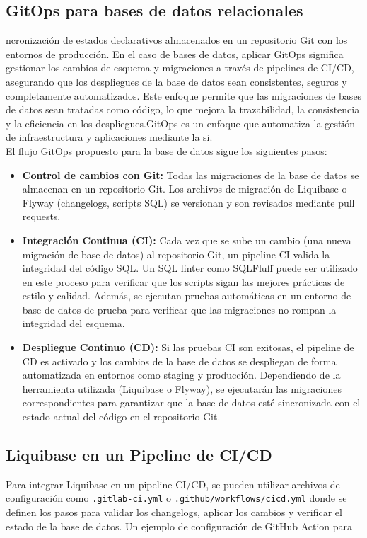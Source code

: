 \documentclass{IEEEtran}
\begin{document}
\subsection{GitOps para bases de datos relacionales}
ncronización de estados declarativos almacenados en un repositorio Git con los entornos de producción. En el caso de bases de datos, aplicar GitOps significa gestionar los cambios de esquema y migraciones a través de pipelines de CI/CD, asegurando que los despliegues de la base de datos sean consistentes, seguros y completamente automatizados. Este enfoque permite que las migraciones de bases de datos sean tratadas como código, lo que mejora la trazabilidad, la consistencia y la eficiencia en los despliegues.GitOps es un enfoque que automatiza la gestión de infraestructura y aplicaciones mediante la si.\\
El flujo GitOps propuesto para la base de datos sigue los siguientes pasos:

\begin{itemize}
    \item \textbf{Control de cambios con Git:} Todas las migraciones de la base de datos se almacenan en un repositorio Git. Los archivos de migración de Liquibase o Flyway (changelogs, scripts SQL) se versionan y son revisados mediante pull requests.
    \item \textbf{Integración Continua (CI):} Cada vez que se sube un cambio (una nueva migración de base de datos) al repositorio Git, un pipeline CI valida la integridad del código SQL. Un SQL linter como SQLFluff puede ser utilizado en este proceso para verificar que los scripts sigan las mejores prácticas de estilo y calidad. Además, se ejecutan pruebas automáticas en un entorno de base de datos de prueba para verificar que las migraciones no rompan la integridad del esquema.
    \item \textbf{Despliegue Continuo (CD):} Si las pruebas CI son exitosas, el pipeline de CD es activado y los cambios de la base de datos se despliegan de forma automatizada en entornos como staging y producción. Dependiendo de la herramienta utilizada (Liquibase o Flyway), se ejecutarán las migraciones correspondientes para garantizar que la base de datos esté sincronizada con el estado actual del código en el repositorio Git.
\end{itemize}

\subsection{Liquibase en un Pipeline de CI/CD}
Para integrar Liquibase en un pipeline CI/CD, se pueden utilizar archivos de configuración como \texttt{.gitlab-ci.yml} o \texttt{.github/workflows/cicd.yml} donde se definen los pasos para validar los changelogs, aplicar los cambios y verificar el estado de la base de datos. Un ejemplo de configuración de GitHub Action para 
\end{document}
